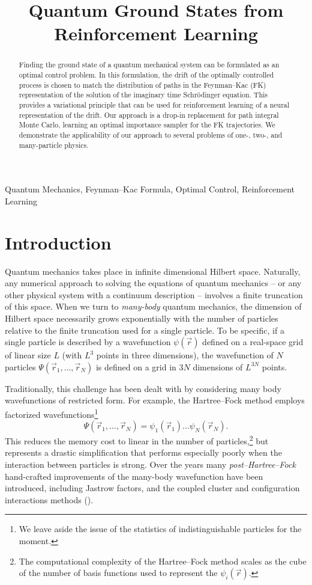 \documentclass[12pt]{msml2020} %
\title[Quantum Ground States from Reinforcement Learning]{Quantum Ground States from Reinforcement Learning}
\begin{document}
\maketitle

\begin{abstract}%
  Finding the ground state of a quantum mechanical system can be formulated as an optimal control problem. In this formulation, the drift of the optimally controlled process is chosen to match the distribution of paths in the Feynman--Kac (FK) representation of the solution of the imaginary time Schr\"odinger equation. This provides a variational principle that can be used for reinforcement learning of a neural representation of the drift. Our approach is a drop-in replacement for path integral Monte Carlo, learning an optimal importance sampler for the FK trajectories. We demonstrate the applicability of our approach to several problems of one-, two-, and many-particle physics.
\end{abstract}

\begin{keywords}%
  Quantum Mechanics, Feynman--Kac Formula, Optimal Control, Reinforcement Learning
\end{keywords}

\section{Introduction}\label{sec:intro}

Quantum mechanics takes place in infinite dimensional Hilbert space. Naturally, any numerical approach to solving the equations of quantum mechanics -- or any other physical system with a continuum description -- involves a finite truncation of this space. When we turn to \emph{many-body} quantum mechanics, the dimension of Hilbert space necessarily grows exponentially with the number of particles relative to the finite truncation used for a single particle. To be specific, if a single particle is described by a wavefunction $\psi(\vec{r})$ defined on a real-space grid of linear size $L$ (with $L^3$ points in three dimensions), the wavefunction of $N$ particles $\Psi(\vec{r}_1,\ldots,\vec{r}_N)$ is defined on a grid in $3N$ dimensions of $L^{3N}$ points.

Traditionally, this challenge has been dealt with by considering many body wavefunctions of restricted form. For example, the Hartree--Fock method employs factorized wavefunctions\footnote{We leave aside the issue of the statistics of indistinguishable particles for the moment.}
%
$$
\Psi(\vec{r}_1,\ldots,\vec{r}_N)=\psi_1(\vec{r}_1)\ldots \psi_N(\vec{r}_N).
$$
%
This reduces the memory cost to linear in the number of particles,\footnote{The computational complexity of the Hartree--Fock method scales as the cube of the number of basis functions used to represent the $\psi_i(\vec{r})$.} but represents a drastic simplification that performs especially poorly when the interaction between particles is strong. Over the years many \emph{post--Hartree--Fock} hand-crafted improvements of the many-body wavefunction have been introduced, including Jastrow factors, and the coupled cluster and configuration interactions methods (\cite{Foulkes:2001aa}).
\end{document}

